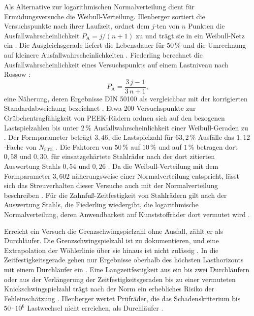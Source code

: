 Als Alternative zur logarithmischen Normalverteilung dient für Ermüdungsversuche die Weibull-Verteilung. Illenberger sortiert die Versuchspunkte nach ihrer Laufzeit, ordnet dem $j$-ten von $n$ Punkten die Ausfallwahrscheinlichkeit $P_{\mathrm{A}} = j/(n+1)$ zu und trägt sie in ein Weibull-Netz ein \cite[Abschnitt~2.3.7, S.~19]{Ill22}. Die Ausgleichsgerade liefert die Lebensdauer für $50$\,\% und die Umrechnung auf kleinere Ausfallwahrscheinlichkeiten \cite[S.~19]{Ill22}. Fiederling berechnet die Ausfallwahrscheinlichkeit eines Versuchspunkts auf einem Lastniveau nach Rossow \cite[Abschnitt~2.5, S.~34]{Fie23}:
\begin{equation}
    P_{\mathrm{A}} = \frac{3\,j - 1}{3\,n + 1} ,
    \label{eq:rossow}
\end{equation}
eine Näherung, deren Ergebnisse DIN 50100 als vergleichbar mit der korrigierten Standardabweichung bezeichnet \cite[Abschnitt~10.1, S.~53]{DIN50100}. Etwa 200 Versuchspunkte zur Grübchentragfähigkeit von PEEK-Rädern ordnen sich auf den bezogenen Lastspielzahlen bis unter $2$\,\% Ausfallwahrscheinlichkeit einer Weibull-Geraden zu \cite[Abschnitt~7.8.1, S.~95 bis 96]{Ill22}. Der Formparameter beträgt $3{,}46$, die Lastspielzahl für $63{,}2$\,\% Ausfälle das $1{,}12$-Fache von $N_{50\%}$ \cite[S.~96]{Ill22}. Die Faktoren von $50$\,\% auf $10$\,\% und auf $1$\,\% betragen dort $0{,}58$ und $0{,}30$, für einsatzgehärtete Stahlräder nach der dort zitierten Auswertung Stahls $0{,}54$ und $0{,}26$ \cite[Tabelle~7-2, S.~96]{Ill22}. Da die Weibull-Verteilung mit dem Formparameter $3{,}602$ näherungsweise einer Normalverteilung entspricht, lässt sich das Streuverhalten dieser Versuche auch mit der Normalverteilung beschreiben \cite[S.~97]{Ill22}. Für die Zahnfuß-Zeitfestigkeit von Stahlrädern gilt nach der Auswertung Stahls, die Fiederling wiedergibt, die logarithmische Normalverteilung, deren Anwendbarkeit auf Kunststoffräder dort vermutet wird \cite[Abschnitt~2.5, S.~33]{Fie23}.

Erreicht ein Versuch die Grenzschwingspielzahl ohne Ausfall, zählt er als Durchläufer. Die Grenzschwingspielzahl ist zu dokumentieren, und eine Extrapolation der Wöhlerlinie über sie hinaus ist nicht zulässig \cite[S.~16 und 62]{DIN50100}. In die Zeitfestigkeitsgerade gehen nur Ergebnisse oberhalb des höchsten Lasthorizonts mit einem Durchläufer ein \cite[Abschnitt~10.2.1, S.~54]{DIN50100}. Eine Langzeitfestigkeit aus ein bis zwei Durchläufern oder aus der Verlängerung der Zeitfestigkeitsgeraden bis zu einer vermuteten Knickschwingspielzahl trägt nach der Norm ein erhebliches Risiko der Fehleinschätzung \cite[Abschnitt~10.3.1, S.~59]{DIN50100}. Illenberger wertet Prüfräder, die das Schadenskriterium bis $50 \cdot 10^{6}$ Lastwechsel nicht erreichen, als Durchläufer \cite[S.~66]{Ill22}.

